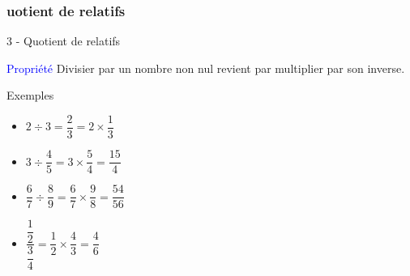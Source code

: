 \documentclass{beamer}
\begin{document}
\begin{frame}
  \frametitle{uotient de relatifs}

  \alert{3 - Quotient de relatifs}

  \begin{block}{\textcolor{blue}{Propriété}}
    Divisier par un nombre non nul revient par multiplier par son inverse.
  \end{block}

  \begin{exampleblock}{Exemples}

    \begin{itemize}
    \item $2 \div 3 = \dfrac{2}{3} = 2 \times \dfrac{1}{3}$ 
    \item $3 \div \dfrac{4}{5} = 3 \times \dfrac{5}{4} = \dfrac{15}{4}$
    \item $\dfrac{6}{7} \div \dfrac{8}{9} = \dfrac{6}{7} \times \dfrac{9}{8} = \dfrac{54}{56}$
    \item $\dfrac{\dfrac{1}{2}}{\dfrac{3}{4}} = \dfrac{1}{2} \times \dfrac{4}{3} = \dfrac{4}{6}$
    \end{itemize}

  \end{exampleblock}
\end{frame}
\end{document}
